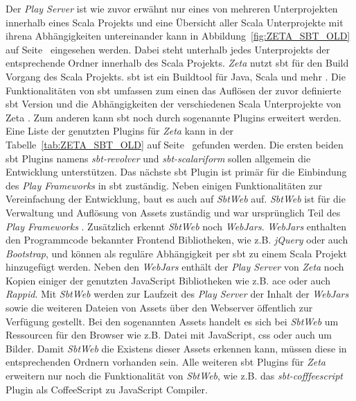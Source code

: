 Der \textit{Play Server} ist wie zuvor erwähnt nur eines von mehreren Unterprojekten innerhalb eines Scala Projekts und eine Übersicht aller Scala Unterprojekte mit ihrena Abhängigkeiten untereinander kann in Abbildung~\ref{fig:ZETA_SBT_OLD} auf Seite~\pageref{fig:ZETA_SBT_OLD} eingesehen werden. Dabei steht unterhalb jedes Unterprojekts der entsprechende Ordner innerhalb des Scala Projekts. \textit{Zeta} nutzt \ac{sbt} für den Build Vorgang des Scala Projekts. \ac{sbt} ist ein Buildtool für Java, Scala und mehr \cite{sbt}. Die Funktionalitäten von \ac{sbt} umfassen zum einen das Auflösen der zuvor definierte \ac{sbt} Version und die Abhängigkeiten der verschiedenen Scala Unterprojekte von Zeta \cite{zeta_api_built}. Zum anderen kann \ac{sbt} noch durch sogenannte Plugins erweitert werden. Eine Liste der genutzten Plugins für \textit{Zeta} kann in der Tabelle~\ref{tab:ZETA_SBT_OLD} auf Seite~\pageref{tab:ZETA_SBT_OLD} gefunden werden. Die ersten beiden \ac{sbt} Plugins namens \textit{sbt-revolver} und \textit{sbt-scalariform} sollen allgemein die Entwicklung unterstützen. Das nächste \ac{sbt} Plugin ist primär für die Einbindung des \textit{Play Frameworks} in \ac{sbt} zuständig. Neben einigen Funktionalitäten zur Vereinfachung der Entwicklung, baut es auch auf \textit{SbtWeb} auf. \textit{SbtWeb} ist für die Verwaltung und Auflösung von Assets zuständig und war ursprünglich Teil des \textit{Play Frameworks} \cite{sbtweb}. Zusätzlich erkennt \textit{SbtWeb} noch \textit{WebJars}. \textit{WebJars} enthalten den Programmcode bekannter Frontend Bibliotheken, wie z.B. \textit{jQuery} oder auch \textit{Bootstrap}, und können als reguläre Abhängigkeit per \ac{sbt} zu einem Scala Projekt hinzugefügt werden. Neben den \textit{WebJars} enthält der \textit{Play Server} von \textit{Zeta} noch Kopien einiger der genutzten JavaScript Bibliotheken wie z.B. \ac{ace} oder auch \textit{Rappid}. Mit \textit{SbtWeb} werden zur Laufzeit des \textit{Play Server} der Inhalt der \textit{WebJars} sowie die weiteren Dateien von Assets über den Webserver öffentlich zur Verfügung gestellt. Bei den sogenannten Assets handelt es sich bei \textit{SbtWeb} um Ressourcen für den Browser wie z.B. Datei mit JavaScript, \ac{css} oder auch um Bilder. Damit \textit{SbtWeb} die Existens dieser Assets erkennen kann, müssen diese in entsprechenden Ordnern vorhanden sein. Alle weiteren \ac{sbt} Plugins für \textit{Zeta} erweitern nur noch die Funktionalität von \textit{SbtWeb}, wie z.B. das \textit{sbt-cofffeescript} Plugin als CoffeeScript zu JavaScript Compiler.


